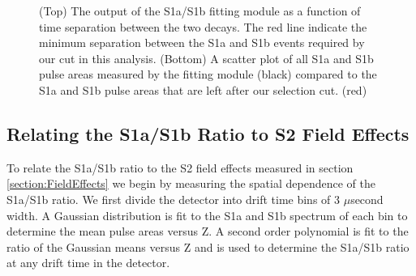 \begin{figure} [!h]
\centering
{}
\qquad
{}
\caption{ (Top) The output of the S1a/S1b fitting module as a function of time separation between the two decays.  The red line indicate the minimum separation between the S1a and S1b events required by our cut in this analysis. (Bottom) A scatter plot of all S1a and S1b pulse areas measured by the fitting module (black) compared to the S1a and S1b pulse areas that are left after our selection cut. (red)}
\label{fig:S1aS1btiming}
\end{figure}

\subsection{Relating the S1a/S1b Ratio to S2 Field Effects} \label{section:S1aS1b2}

To relate the S1a/S1b ratio to the S2 field effects measured in section \ref{section:FieldEffects} we begin by measuring the spatial dependence of the S1a/S1b ratio.  We first divide the detector into drift time bins of 3 $\mu$second width.   A Gaussian distribution is fit to the S1a and S1b spectrum of each bin to determine the mean pulse areas versus Z.   A second order polynomial is fit to the ratio of the Gaussian means versus Z and is used to determine the S1a/S1b ratio at any drift time in the detector.  

